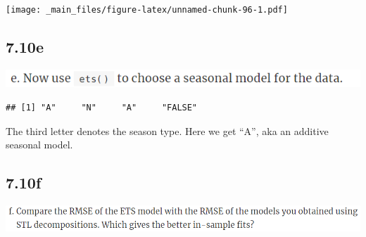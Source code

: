 \documentclass[]{book}
\newenvironment{Shaded}{\begin{snugshade}}{\end{snugshade}}
\newcommand{\DataTypeTok}[1]{\textcolor[rgb]{0.13,0.29,0.53}{#1}}
\newcommand{\DecValTok}[1]{\textcolor[rgb]{0.00,0.00,0.81}{#1}}
\newcommand{\KeywordTok}[1]{\textcolor[rgb]{0.13,0.29,0.53}{\textbf{#1}}}
\newcommand{\NormalTok}[1]{#1}
\newcommand{\OperatorTok}[1]{\textcolor[rgb]{0.81,0.36,0.00}{\textbf{#1}}}
\newcommand{\OtherTok}[1]{\textcolor[rgb]{0.56,0.35,0.01}{#1}}
\newcommand{\StringTok}[1]{\textcolor[rgb]{0.31,0.60,0.02}{#1}}
\begin{document}
\begin{Shaded}
\end{Shaded}

\texttt{[image: \_main\_files/figure-latex/unnamed-chunk-96-1.pdf]}

\hypertarget{e-3}{%
\subsection{7.10e}\label{e-3}}

\includegraphics{./week4/7.10e.png}

\begin{Shaded}
\end{Shaded}

\begin{verbatim}
## [1] "A"     "N"     "A"     "FALSE"
\end{verbatim}

The third letter denotes the season type. Here we get ``A'', aka an additive seasonal model.

\hypertarget{f-3}{%
\subsection{7.10f}\label{f-3}}

\includegraphics{./week4/7.10f.png}
\end{document}
